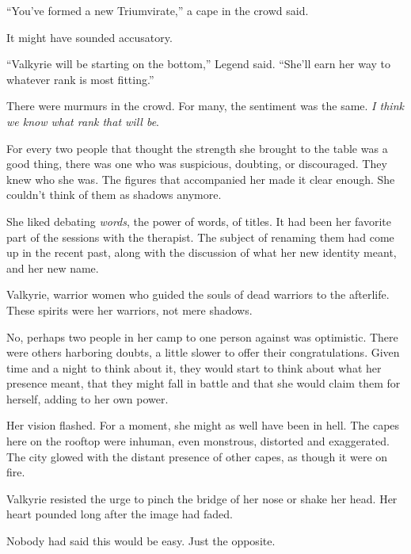 ``You've formed a new Triumvirate,'' a cape in the crowd said.



It might have sounded accusatory.



``Valkyrie will be starting on the bottom,'' Legend said.  ``She'll earn her way to whatever rank is most fitting.''



There were murmurs in the crowd.  For many, the sentiment was the same.  \emph{I think we know what rank that will be}.



For every two people that thought the strength she brought to the table was a good thing, there was one who was suspicious, doubting, or discouraged. They knew who she was.  The figures that accompanied her made it clear enough.  She couldn't think of them as shadows anymore.



She liked debating \emph{words}, the power of words, of titles.  It had been her favorite part of the sessions with the therapist.  The subject of renaming them had come up in the recent past, along with the discussion of what her new identity meant, and her new name.



Valkyrie, warrior women who guided the souls of dead warriors to the afterlife.  These spirits were her warriors, not mere shadows.



No, perhaps two people in her camp to one person against was optimistic.  There were others harboring doubts, a little slower to offer their congratulations.  Given time and a night to think about it, they would start to think about what her presence meant, that they might fall in battle and that she would claim them for herself, adding to her own power.



Her vision flashed.  For a moment, she might as well have been in hell.  The capes here on the rooftop were inhuman, even monstrous, distorted and exaggerated.  The city glowed with the distant presence of other capes, as though it were on fire.



Valkyrie resisted the urge to pinch the bridge of her nose or shake her head.  Her heart pounded long after the image had faded.



Nobody had said this would be easy.  Just the opposite.




